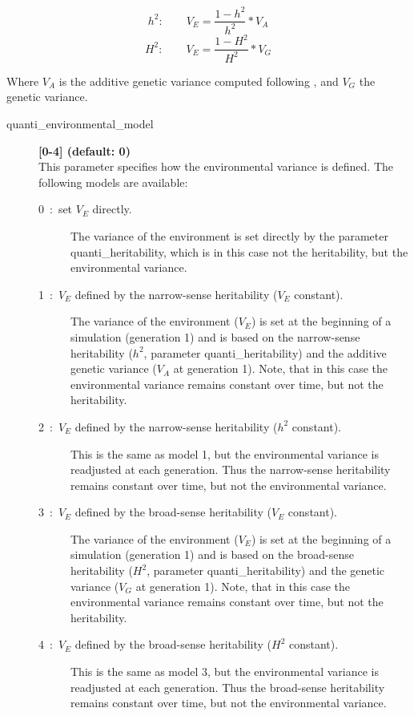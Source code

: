 \documentclass[letterpaper,12pt,oneside]{book}
\begin{document}
\[h^{2}: \qquad V_{E} = \frac{1-h^{2}}{h^{2}}*V_{A}\]
\[H^{2}: \qquad V_{E} = \frac{1-H^{2}}{H^{2}}*V_{G}\]

Where $V_{A}$ is the additive genetic variance computed following \citep[p85-87]{Lynch_1998}, and $V_{G}$ the genetic variance.  
\begin{description}
\item[quanti\_environmental\_model] \textbf{[0-4] (default: 0)}\\
This parameter specifies how the environmental variance is defined. The following models are available:
\begin{description}
\item [0~:~set $V_{E}$ directly.] The variance of the environment is set directly by the parameter \textsf{quanti\_heritability}, which is in this case not the heritability, but the environmental variance.
\item [1~:~$V_{E}$ defined by the narrow-sense heritability ($V_{E}$ constant).] The variance of the environment ($V_{E}$) is set at the beginning of a simulation (generation 1) and is based on the narrow-sense heritability ($h^{2}$, parameter \textsf{quanti\_heritability}) and the additive genetic variance ($V_{A}$ at generation 1). Note, that in this case the environmental variance remains constant over time, but not the heritability.
\item [2~:~$V_{E}$ defined by the narrow-sense heritability ($h^{2}$ constant).] This is the same as model 1, but the environmental variance is readjusted at each generation. Thus the narrow-sense heritability remains constant over time, but not the environmental variance. 
\item [3~:~$V_{E}$ defined by the broad-sense heritability ($V_{E}$ constant).] The variance of the environment ($V_{E}$) is set at the beginning of a simulation (generation 1) and is based on the broad-sense heritability ($H^{2}$, parameter \textsf{quanti\_heritability}) and the genetic variance ($V_{G}$ at generation 1). Note, that in this case the environmental variance remains constant over time, but not the heritability.
\item [4~:~$V_{E}$ defined by the broad-sense heritability ($H^{2}$ constant).] This is the same as model 3, but the environmental variance is readjusted at each generation. Thus the broad-sense heritability remains constant over time, but not the environmental variance. 
\end{description}


\end{description}
\end{document}
